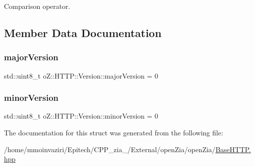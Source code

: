 Comparison operator. 



\subsection{Member Data Documentation}
\mbox{\label{structo_z_1_1_h_t_t_p_1_1_version_a451d759d7fcdcef197c21140b1e9527e}} 
\subsubsection{\texorpdfstring{majorVersion}{majorVersion}}
{\footnotesize\ttfamily std\+::uint8\+\_\+t o\+Z\+::\+H\+T\+T\+P\+::\+Version\+::major\+Version = 0}

\mbox{\label{structo_z_1_1_h_t_t_p_1_1_version_a13e3758802c2b9b974f56d1ea25fafad}} 
\subsubsection{\texorpdfstring{minorVersion}{minorVersion}}
{\footnotesize\ttfamily std\+::uint8\+\_\+t o\+Z\+::\+H\+T\+T\+P\+::\+Version\+::minor\+Version = 0}



The documentation for this struct was generated from the following file\+:\begin{DoxyCompactItemize}
\item 
/home/mmoinvaziri/\+Epitech/\+C\+P\+P\+\_\+zia\+\_/\+External/open\+Zia/open\+Zia/\mbox{\hyperlink{_base_h_t_t_p_8hpp}{Base\+H\+T\+T\+P.\+hpp}}\end{DoxyCompactItemize}
